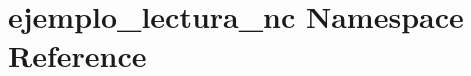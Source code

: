 \hypertarget{namespaceejemplo__lectura__nc}{\section{ejemplo\-\_\-lectura\-\_\-nc Namespace Reference}
\label{namespaceejemplo__lectura__nc}
}
